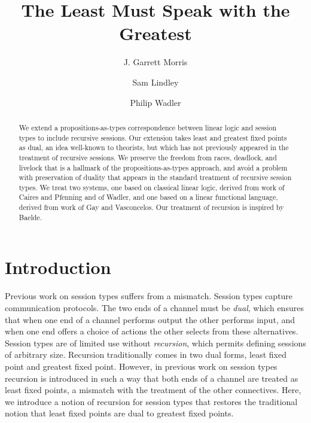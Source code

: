 \documentclass[orivec,envcountsame]{llncs}
\title{The Least Must Speak with the Greatest\vspace{-3mm}}
\author{J. Garrett Morris \and Sam Lindley \and Philip Wadler}
\institute{The University of Edinburgh \\
           \email{\{Garrett.Morris,Sam.Lindley,Philip.Wadler\}@ed.ac.uk} \vspace{-5mm}}
\begin{document}
\maketitle

\begin{abstract}
  We extend a propositions-as-types correspondence between linear logic and session types to include
  recursive sessions.  Our extension takes least and greatest fixed points as dual, an idea
  well-known to theorists, but which has not previously appeared in the treatment of recursive
  sessions. We preserve the freedom from races, deadlock, and livelock that is a hallmark of the
  propositions-as-types approach, and avoid a problem with preservation of duality that appears in
  the standard treatment of recursive session types. We treat two systems, one based on classical
  linear logic, derived from work of Caires and Pfenning and of Wadler, and one based on a linear
  functional language, derived from work of Gay and Vasconcelos. Our treatment of recursion is
  inspired by Baelde.
\end{abstract}

\vspace{-7mm}
\section{Introduction}\label{sec:intro}

Previous work on session types suffers from a mismatch.  Session types capture communication
protocols. The two ends of a channel must be \emph{dual}, which ensures that when one end of a
channel performs output the other performs input, and when one end offers a choice of actions the
other selects from these alternatives. Session types are of limited use without \emph{recursion},
which permits defining sessions of arbitrary size. Recursion traditionally comes in two dual forms,
least fixed point and greatest fixed point. However, in previous work on session types recursion is
introduced in such a way that both ends of a channel are treated as least fixed points, a mismatch
with the treatment of the other connectives. Here, we introduce a notion of recursion for session
types that restores the traditional notion that least fixed points are dual to greatest fixed
points.
\end{document}
